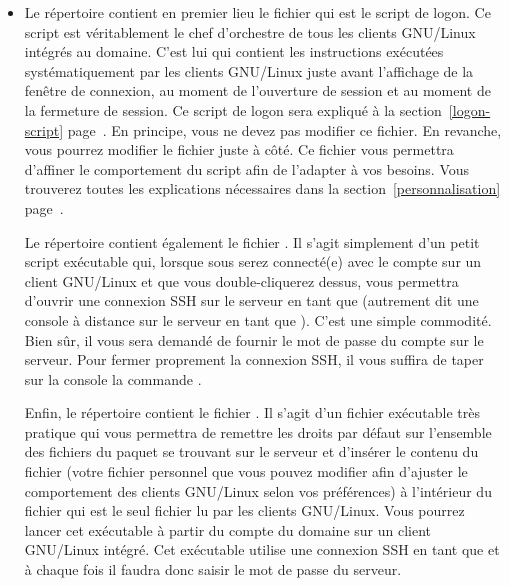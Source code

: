\begin{itemize}
\item Le répertoire  contient en premier lieu
le fichier  qui est le script de logon. Ce
script est véritablement le chef d'orchestre de tous les clients
GNU/Linux intégrés au domaine. C'est lui
qui contient les instructions exécutées
systématiquement par les
clients GNU/Linux juste avant l'affichage de la fenêtre de connexion,
au moment de l'ouverture de session et au moment de la fermeture
de session. Ce script de logon sera expliqué à la 
section~\ref{logon-script} page~\pageref{logon-script}.
En principe, vous ne devez pas modifier ce fichier.
En revanche, vous pourrez modifier le fichier 
juste à côté.
Ce fichier vous permettra d'affiner le comportement du script
 afin de l'adapter à vos besoins.
Vous trouverez toutes les explications nécessaires
dans la section~\ref{personnalisation} page~\pageref{personnalisation}.

Le répertoire  contient également le fichier
. Il s'agit simplement
d'un petit script exécutable qui, lorsque sous serez connecté(e)
avec le compte  sur un client GNU/Linux et que vous 
double-cliquerez dessus, vous permettra d'ouvrir une connexion SSH
sur le serveur en tant que  (autrement dit une 
console à distance sur le serveur en tant que ).
C'est une simple commodité. Bien sûr, il vous
sera demandé de fournir le mot de passe du compte 
sur le serveur. Pour fermer proprement la connexion SSH, il vous
suffira de taper sur la console la commande .

Enfin, le répertoire  contient le fichier
. Il s'agit d'un fichier exécutable
très pratique qui vous permettra de remettre les droits par défaut
sur l'ensemble des fichiers du paquet 
se trouvant sur le serveur et d'insérer le contenu du fichier 
 (votre fichier personnel que vous pouvez
modifier afin d'ajuster le comportement des clients GNU/Linux selon vos préférences)
à l'intérieur du fichier  qui est le seul fichier lu par
les clients GNU/Linux. Vous pourrez lancer cet exécutable
à partir du compte  du domaine sur un client GNU/Linux
intégré. Cet exécutable utilise une connexion SSH en tant que
 et à chaque fois il faudra donc saisir le mot de
passe  du serveur.



\end{itemize}
